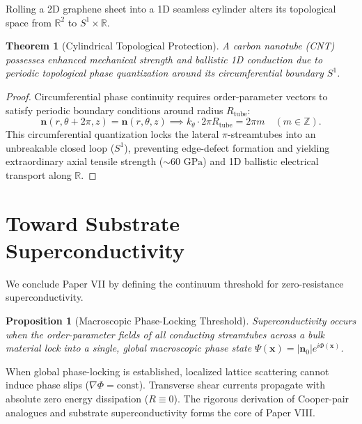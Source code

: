 \documentclass[11pt,a4paper]{article}
\newtheorem{prop}{Proposition}
\newtheorem{thm}{Theorem}
\begin{document}
	Rolling a 2D graphene sheet into a 1D seamless cylinder alters its topological space from $\mathbb{R}^2$ to $S^1 \times \mathbb{R}$.
	
	\begin{thm}[Cylindrical Topological Protection]
		\label{thm:nanotubes}
		A carbon nanotube (CNT) possesses enhanced mechanical strength and ballistic 1D conduction due to periodic topological phase quantization around its circumferential boundary $S^1$.
	\end{thm}
	
	\begin{proof}
		Circumferential phase continuity requires order-parameter vectors to satisfy periodic boundary conditions around radius $R_{\text{tube}}$:
		\begin{equation}
			\mathbf{n}(r, \theta + 2\pi, z) = \mathbf{n}(r, \theta, z) \implies k_\theta \cdot 2\pi R_{\text{tube}} = 2\pi m \quad (m \in \mathbb{Z}).
		\end{equation}
		This circumferential quantization locks the lateral $\pi$-streamtubes into an unbreakable closed loop ($S^1$), preventing edge-defect formation and yielding extraordinary axial tensile strength ($\sim 60 \text{ GPa}$) and 1D ballistic electrical transport along $\mathbb{R}$.
	\end{proof}
	
	\section{Toward Substrate Superconductivity}
	\label{sec:toward_superconductivity}
	
	We conclude Paper VII by defining the continuum threshold for zero-resistance superconductivity.
	
	\begin{prop}[Macroscopic Phase-Locking Threshold]
		\label{prop:superconductive_threshold}
		Superconductivity occurs when the order-parameter fields of all conducting streamtubes across a bulk material lock into a single, global macroscopic phase state $\Psi(\mathbf{x}) = |\mathbf{n}_0| e^{i \Phi(\mathbf{x})}$.
	\end{prop}
	
	When global phase-locking is established, localized lattice scattering cannot induce phase slips ($\nabla \Phi = \text{const}$). Transverse shear currents propagate with absolute zero energy dissipation ($R \equiv 0$). The rigorous derivation of Cooper-pair analogues and substrate superconductivity forms the core of Paper VIII.
	
\end{document}
